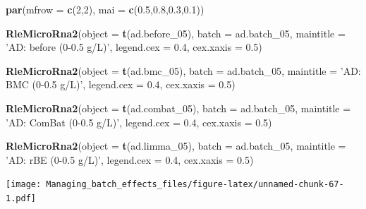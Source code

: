 \documentclass[]{book}
\newenvironment{Shaded}{\begin{snugshade}}{\end{snugshade}}
\newcommand{\KeywordTok}[1]{\textcolor[rgb]{0.13,0.29,0.53}{\textbf{#1}}}
\newcommand{\DataTypeTok}[1]{\textcolor[rgb]{0.13,0.29,0.53}{#1}}
\newcommand{\DecValTok}[1]{\textcolor[rgb]{0.00,0.00,0.81}{#1}}
\newcommand{\FloatTok}[1]{\textcolor[rgb]{0.00,0.00,0.81}{#1}}
\newcommand{\StringTok}[1]{\textcolor[rgb]{0.31,0.60,0.02}{#1}}
\newcommand{\NormalTok}[1]{#1}
\begin{document}
\begin{Shaded}
\begin{Highlighting}[]
\KeywordTok{par}\NormalTok{(}\DataTypeTok{mfrow =} \KeywordTok{c}\NormalTok{(}\DecValTok{2}\NormalTok{,}\DecValTok{2}\NormalTok{), }\DataTypeTok{mai =} \KeywordTok{c}\NormalTok{(}\FloatTok{0.5}\NormalTok{,}\FloatTok{0.8}\NormalTok{,}\FloatTok{0.3}\NormalTok{,}\FloatTok{0.1}\NormalTok{))}

\KeywordTok{RleMicroRna2}\NormalTok{(}\DataTypeTok{object =} \KeywordTok{t}\NormalTok{(ad.before_}\DecValTok{05}\NormalTok{), }\DataTypeTok{batch =}\NormalTok{ ad.batch_}\DecValTok{05}\NormalTok{, }
             \DataTypeTok{maintitle =} \StringTok{'AD: before (0-0.5 g/L)'}\NormalTok{, }\DataTypeTok{legend.cex =} \FloatTok{0.4}\NormalTok{, }
             \DataTypeTok{cex.xaxis =} \FloatTok{0.5}\NormalTok{)}

\KeywordTok{RleMicroRna2}\NormalTok{(}\DataTypeTok{object =} \KeywordTok{t}\NormalTok{(ad.bmc_}\DecValTok{05}\NormalTok{), }\DataTypeTok{batch =}\NormalTok{ ad.batch_}\DecValTok{05}\NormalTok{, }
             \DataTypeTok{maintitle =} \StringTok{'AD: BMC (0-0.5 g/L)'}\NormalTok{, }\DataTypeTok{legend.cex =} \FloatTok{0.4}\NormalTok{, }
             \DataTypeTok{cex.xaxis =} \FloatTok{0.5}\NormalTok{)}

\KeywordTok{RleMicroRna2}\NormalTok{(}\DataTypeTok{object =} \KeywordTok{t}\NormalTok{(ad.combat_}\DecValTok{05}\NormalTok{), }\DataTypeTok{batch =}\NormalTok{ ad.batch_}\DecValTok{05}\NormalTok{, }
             \DataTypeTok{maintitle =} \StringTok{'AD: ComBat (0-0.5 g/L)'}\NormalTok{, }\DataTypeTok{legend.cex =} \FloatTok{0.4}\NormalTok{, }
             \DataTypeTok{cex.xaxis =} \FloatTok{0.5}\NormalTok{)}

\KeywordTok{RleMicroRna2}\NormalTok{(}\DataTypeTok{object =} \KeywordTok{t}\NormalTok{(ad.limma_}\DecValTok{05}\NormalTok{), }\DataTypeTok{batch =}\NormalTok{ ad.batch_}\DecValTok{05}\NormalTok{, }
             \DataTypeTok{maintitle =} \StringTok{'AD: rBE (0-0.5 g/L)'}\NormalTok{, }\DataTypeTok{legend.cex =} \FloatTok{0.4}\NormalTok{, }
             \DataTypeTok{cex.xaxis =} \FloatTok{0.5}\NormalTok{)}
\end{Highlighting}
\end{Shaded}

\texttt{[image: Managing\_batch\_effects\_files/figure-latex/unnamed-chunk-67-1.pdf]}
\end{document}
